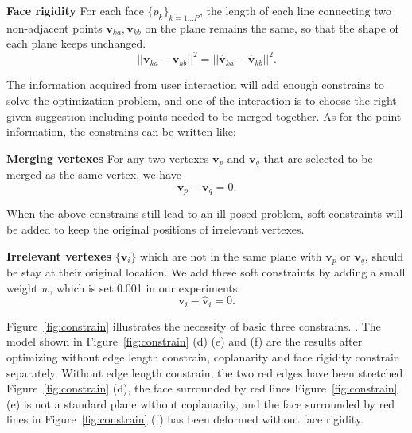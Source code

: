 \noindent
\textbf{Face rigidity} For each face $\{p_k\}_{k=1 \dots P}$, the length of each line connecting two non-adjacent points $\mathbf{v}_{ka}, \mathbf{v}_{kb}$ on the plane remains the same, so that the shape of each plane keeps unchanged.
\begin{equation}
||\mathbf{v}_{ka} - \mathbf{v}_{kb}||^2 = ||\hat{\mathbf{v}}_{ka} - \hat{\mathbf{v}}_{kb}||^2.
\label{equ:plane}
\end{equation}

The information acquired from user interaction will add enough constrains to solve the optimization problem, and one of the interaction is to choose the right given suggestion including points needed to be merged together. As for the point information, the constrains can be written like:

\noindent
\textbf{Merging vertexes} For any two vertexes $\mathbf{v}_p$ and $\mathbf{v}_q$ that are selected to be merged as the same vertex, we have 
\begin{equation}
\mathbf{v}_p - \mathbf{v}_q = 0.
\label{equ:point}
\end{equation}


When the above constrains still lead to an ill-posed problem, soft constraints will be added to keep the original positions of irrelevant vertexes. 


\noindent
\textbf{Irrelevant vertexes} $\{\mathbf{v}_i\}$ which are not in the same plane with $\mathbf{v}_p$ or $\mathbf{v}_q$, should be stay at their original location. 
We add these soft constraints by adding a small weight $w$, which is set 0.001 in our experiments. 
\begin{equation}
\mathbf{v}_i - \mathbf{\hat{v}}_i = 0.
\label{equ:irrelevant}
\end{equation}

Figure~\ref{fig:constrain} illustrates the necessity of basic three constrains.
{. The model shown in Figure~\ref{fig:constrain} (d) (e) and (f) are the results after optimizing without edge length constrain, coplanarity and face rigidity constrain separately. Without edge length constrain, the two red edges have been stretched Figure~\ref{fig:constrain} (d), the face surrounded by red lines Figure~\ref{fig:constrain} (e) is not a standard plane without coplanarity, and the face surrounded by red lines in Figure~\ref{fig:constrain} (f) has been deformed without face rigidity.}

